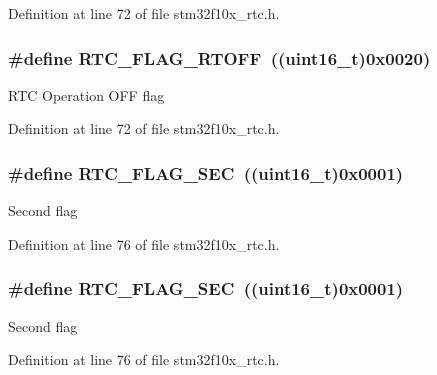 Definition at line 72 of file stm32f10x\+\_\+rtc.\+h.

\subsubsection[{\texorpdfstring{R\+T\+C\+\_\+\+F\+L\+A\+G\+\_\+\+R\+T\+O\+FF}{RTC_FLAG_RTOFF}}]{\setlength{\rightskip}{0pt plus 5cm}\#define R\+T\+C\+\_\+\+F\+L\+A\+G\+\_\+\+R\+T\+O\+FF~(({\bf uint16\+\_\+t})0x0020)}\hypertarget{group___r_t_c__interrupts__flags_ga203dcbb991497e4d0e6722815f6db942}{}\label{group___r_t_c__interrupts__flags_ga203dcbb991497e4d0e6722815f6db942}
R\+TC Operation O\+FF flag 

Definition at line 72 of file stm32f10x\+\_\+rtc.\+h.

\subsubsection[{\texorpdfstring{R\+T\+C\+\_\+\+F\+L\+A\+G\+\_\+\+S\+EC}{RTC_FLAG_SEC}}]{\setlength{\rightskip}{0pt plus 5cm}\#define R\+T\+C\+\_\+\+F\+L\+A\+G\+\_\+\+S\+EC~(({\bf uint16\+\_\+t})0x0001)}\hypertarget{group___r_t_c__interrupts__flags_ga8babb2c823c2097bf4a4ef0c20ef7367}{}\label{group___r_t_c__interrupts__flags_ga8babb2c823c2097bf4a4ef0c20ef7367}
Second flag 

Definition at line 76 of file stm32f10x\+\_\+rtc.\+h.

\subsubsection[{\texorpdfstring{R\+T\+C\+\_\+\+F\+L\+A\+G\+\_\+\+S\+EC}{RTC_FLAG_SEC}}]{\setlength{\rightskip}{0pt plus 5cm}\#define R\+T\+C\+\_\+\+F\+L\+A\+G\+\_\+\+S\+EC~(({\bf uint16\+\_\+t})0x0001)}\hypertarget{group___r_t_c__interrupts__flags_ga8babb2c823c2097bf4a4ef0c20ef7367}{}\label{group___r_t_c__interrupts__flags_ga8babb2c823c2097bf4a4ef0c20ef7367}
Second flag 

Definition at line 76 of file stm32f10x\+\_\+rtc.\+h.

